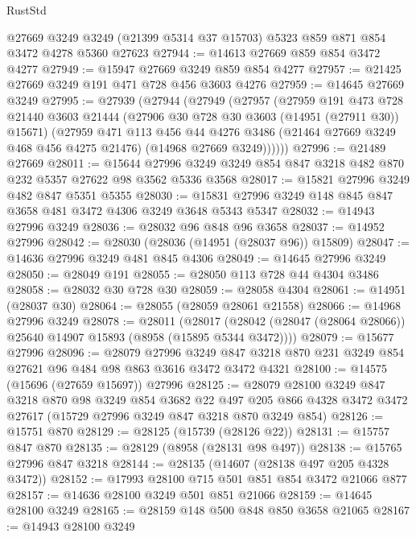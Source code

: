 \begin{lexlean}{RustStd}
\begin{coremodule}
    @27669
    @3249
    @3249
    (@21399 @5314 @37 @15703)
    @5323
    @859
    @871
    @854
    @3472
    @4278
    @5360
    @27623
@27944 := @14613 @27669 @859 @854 @3472 @4277
@27949 := @15947 @27669 @3249 @859 @854 @4277
@27957 := @21425 @27669 @3249 @191 @471 @728 @456 @3603 @4276
@27959 := @14645 @27669 @3249
@27995 := @27939
    (@27944
      (@27949
        (@27957
          (@27959
            @191
            @473
            @728
            @21440
            @3603
            @21444
            (@27906 @30 @728 @30 @3603 (@14951 (@27911 @30)) @15671)
            (@27959
              @471
              @113
              @456
              @44
              @4276
              @3486
              (@21464 @27669 @3249 @468 @456 @4275 @21476)
              (@14968 @27669 @3249))))))
@27996 := @21489 @27669
@28011 := @15644
    @27996
    @3249
    @3249
    @854
    @847
    @3218
    @482
    @870
    @232
    @5357
    @27622
    @98
    @3562
    @5336
    @3568
@28017 := @15821 @27996 @3249 @482 @847 @5351 @5355
@28030 := @15831 @27996 @3249 @148 @845 @847 @3658 @481 @3472 @4306 @3249 @3648 @5343 @5347
@28032 := @14943 @27996 @3249
@28036 := @28032 @96 @848 @96 @3658
@28037 := @14952 @27996
@28042 := @28030 (@28036 (@14951 (@28037 @96)) @15809)
@28047 := @14636 @27996 @3249 @481 @845 @4306
@28049 := @14645 @27996 @3249
@28050 := @28049 @191
@28055 := @28050 @113 @728 @44 @4304 @3486
@28058 := @28032 @30 @728 @30
@28059 := @28058 @4304
@28061 := @14951 (@28037 @30)
@28064 := @28055 (@28059 @28061 @21558)
@28066 := @14968 @27996 @3249
@28078 := @28011
    (@28017 (@28042 (@28047 (@28064 @28066)) @25640 @14907 @15893 (@8958 (@15895 @5344 @3472))))
@28079 := @15677 @27996
@28096 := @28079
    @27996
    @3249
    @847
    @3218
    @870
    @231
    @3249
    @854
    @27621
    @96
    @484
    @98
    @863
    @3616
    @3472
    @3472
    @4321
@28100 := @14575 (@15696 (@27659 @15697)) @27996
@28125 := @28079
    @28100
    @3249
    @847
    @3218
    @870
    @98
    @3249
    @854
    @3682
    @22
    @497
    @205
    @866
    @4328
    @3472
    @3472
    @27617
    (@15729 @27996 @3249 @847 @3218 @870 @3249 @854)
@28126 := @15751 @870
@28129 := @28125 (@15739 (@28126 @22))
@28131 := @15757 @847 @870
@28135 := @28129 (@8958 (@28131 @98 @497))
@28138 := @15765 @27996 @847 @3218
@28144 := @28135 (@14607 (@28138 @497 @205 @4328 @3472))
@28152 := @17993 @28100 @715 @501 @851 @854 @3472 @21066 @877
@28157 := @14636 @28100 @3249 @501 @851 @21066
@28159 := @14645 @28100 @3249
@28165 := @28159 @148 @500 @848 @850 @3658 @21065
@28167 := @14943 @28100 @3249

\end{coremodule}
\end{lexlean}
